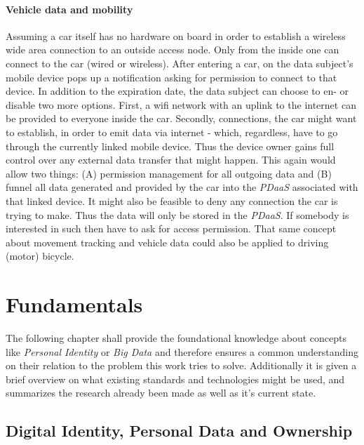 \documentclass[12pt,english,a4paper,titlepage,cleardoublepage=empty,dottedtoc]{report}
\begin{document}
\subsubsection{Vehicle data and
mobility}\label{vehicle-data-and-mobility}

Assuming a car itself has no hardware on board in order to establish a
wireless wide area connection to an outside access node. Only from the
inside one can connect to the car (wired or wireless). After entering a
car, on the data subject's mobile device pops up a notification asking
for permission to connect to that device. In addition to the expiration
date, the data subject can choose to en- or disable two more options.
First, a wifi network with an uplink to the internet can be provided to
everyone inside the car. Secondly, connections, the car might want to
establish, in order to emit data via internet - which, regardless, have
to go through the currently linked mobile device. Thus the device owner
gains full control over any external data transfer that might happen.
This again would allow two things: (A) permission management for all
outgoing data and (B) funnel all data generated and provided by the car
into the \emph{PDaaS} associated with that linked device. It might also
be feasible to deny any connection the car is trying to make. Thus the
data will only be stored in the \emph{PDaaS}. If somebody is interested
in such then have to ask for access permission. That same concept about
movement tracking and vehicle data could also be applied to driving
(motor) bicycle.

\chapter{Fundamentals}\label{fundamentals}

The following chapter shall provide the foundational knowledge about
concepts like \emph{Personal Identity} or \emph{Big Data} and therefore
ensures a common understanding on their relation to the problem this
work tries to solve. Additionally it is given a brief overview on what
existing standards and technologies might be used, and summarizes the
research already been made as well as it's current state.

\hypertarget{digital-identity-personal-data-and-ownership}{\section{Digital
Identity, Personal Data and
Ownership}\label{digital-identity-personal-data-and-ownership}}
\end{document}

